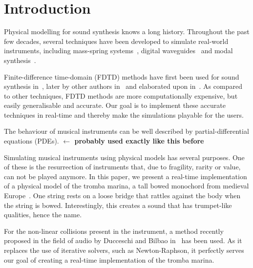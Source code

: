 \documentclass[dvipsnames]{article}
\title{\papertitle}
\def\SBcomment[#1]{\textcolor{Red}{#1}}
\def\MDcomment[#1]{\textcolor{Blue}{#1}}
\def\SScomment[#1]{\textcolor{OliveGreen}{#1}}
\begin{document}
%
\capstartfalse
\maketitle
\capstarttrue
%
\begin{abstract}
You can place comments in colour if you want :) Like \SBcomment[this (Stefan)], \MDcomment[this (Michele)] or \SScomment[this (Stefania)].
\end{abstract}
%

\section{Introduction}\label{sec:introduction}
Physical modelling for sound synthesis knows a long history. Throughout the past few decades, several techniques have been developed to simulate real-world instruments, including mass-spring systems~\cite{cadoz79, cadoz83, cadoz1993cordis}, digital waveguides~\cite{smith1992physical} and modal synthesis~\cite{morrison1993mosaic}. 

Finite-difference time-domain (FDTD) methods have first been used for sound synthesis in~\cite{Ruiz1969, Hiller1971, Hiller2}, later by other authors in~\cite{Chaigne92, Chaigne} and elaborated upon in~\cite{bilbao2009numerical, Bilbao2018:Tutorial}. As compared to other techniques, FDTD methods are more computationally expensive, but easily generalisable and accurate. Our goal is to implement these accurate techniques in real-time and thereby make the simulations playable for the users. 

The behaviour of musical instruments can be well described by partial-differential equations (PDEs). \textbf{$\leftarrow$ probably used exactly like this before}

Simulating musical instruments using physical models has several purposes. One of these is the resurrection of instruments that, due to fragility, rarity or value, can not be played anymore. In this paper, we present a real-time implementation of a physical model of the tromba marina, a tall bowed monochord from medieval Europe~\cite{encyclopaedia2020}. One string rests on a loose bridge that rattles against the body when the string is bowed. Interestingly, this creates a sound that has trumpet-like qualities, hence the name. 

For the non-linear collisions present in the instrument, a method recently proposed in the field of audio by Ducceschi and Bilbao in~\cite{Ducceschi2019} has been used. As it replaces the use of iterative solvers, such as Newton-Raphson, it perfectly serves our goal of creating a real-time implementation of the tromba marina.
\end{document}
